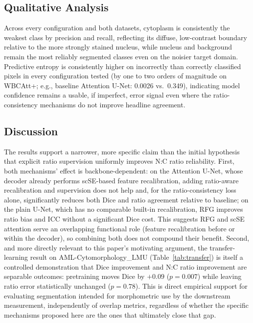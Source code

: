 \documentclass[pdflatex,sn-mathphys-num]{sn-jnl}%
\theoremstyle{thmstyleone}%
\theoremstyle{thmstyletwo}%
\theoremstyle{thmstylethree}%
\begin{document}
\subsection{Qualitative Analysis}

Across every configuration and both datasets, cytoplasm is consistently the weakest class by precision and recall, reflecting its diffuse, low-contrast boundary relative to the more strongly stained nucleus, while nucleus and background remain the most reliably segmented classes even on the noisier target domain. Predictive entropy is consistently higher on incorrectly than correctly classified pixels in every configuration tested (by one to two orders of magnitude on WBCAtt+; e.g., baseline Attention U-Net: 0.0026 vs.\ 0.349), indicating model confidence remains a usable, if imperfect, error signal even where the ratio-consistency mechanisms do not improve headline agreement.


\subsection{Discussion}
\label{sec:resultsdiscussion}

The results support a narrower, more specific claim than the initial hypothesis that explicit ratio supervision uniformly improves N:C ratio reliability. First, both mechanisms' effect is backbone-dependent: on the Attention U-Net, whose decoder already performs scSE-based feature recalibration, adding ratio-aware recalibration and supervision does not help and, for the ratio-consistency loss alone, significantly reduces both Dice and ratio agreement relative to baseline; on the plain U-Net, which has no comparable built-in recalibration, RFG improves ratio bias and ICC without a significant Dice cost. This suggests RFG and scSE attention serve an overlapping functional role (feature recalibration before or within the decoder), so combining both does not compound their benefit. Second, and more directly relevant to this paper's motivating argument, the transfer-learning result on AML-Cytomorphology\_LMU (Table~\ref{tab:transfer}) is itself a controlled demonstration that Dice improvement and N:C ratio improvement are separable outcomes: pretraining moves Dice by $+0.09$ ($p=0.007$) while leaving ratio error statistically unchanged ($p=0.78$). This is direct empirical support for evaluating segmentation intended for morphometric use by the downstream measurement, independently of overlap metrics, regardless of whether the specific mechanisms proposed here are the ones that ultimately close that gap.
\end{document}
